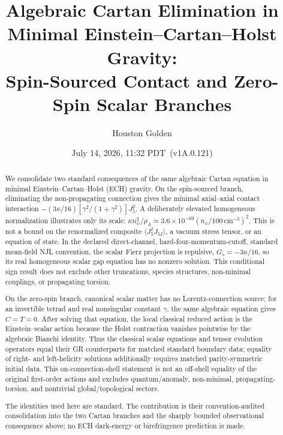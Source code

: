 \documentclass[aps,prd,twocolumn,superscriptaddress,showpacs,preprintnumbers,nofootinbib,longbibliography,floatfix]{revtex4-2}
\newcommand{\paperVersion}{v1A.0.121}
\newcommand{\paperTimestamp}{July 14, 2026, 11:32 PDT}
\begin{document}

\title{Algebraic Cartan Elimination in Minimal Einstein--Cartan--Holst Gravity:\\
Spin-Sourced Contact and Zero-Spin Scalar Branches}

\author{Houston Golden}

\date{\paperTimestamp\ (\paperVersion)}

\begin{abstract}
We consolidate two standard consequences of the same algebraic Cartan
equation in minimal Einstein--Cartan--Holst (ECH) gravity.  On the
spin-sourced branch, eliminating the non-propagating connection gives the
minimal axial--axial contact interaction
$-(3\kappa/16)[\gamma^2/(1+\gamma^2)]J_5^2$.  A deliberately elevated
homogeneous normalization illustrates only its scale:
$\kappa n_\psi^2/\rho_\Lambda\simeq
3.6\times10^{-69}(n_\psi/100\,\mathrm{cm}^{-3})^2$.
This is not a bound on the renormalized composite
$\langle J_5^I J_{5I}\rangle$, a vacuum stress tensor, or an equation of
state.  In the declared direct-channel, hard-four-momentum-cutoff, standard
mean-field NJL convention, the scalar Fierz projection is repulsive,
$G_s=-3\kappa/16$, so its real homogeneous scalar gap equation has no nonzero
solution.  This conditional sign result does not exclude other truncations,
species structures, non-minimal couplings, or propagating torsion.

On the zero-spin branch, canonical scalar matter has no Lorentz-connection
source; for an invertible tetrad and real nonsingular constant $\gamma$, the
same algebraic equation gives $C=T=0$.  After solving that equation, the local
classical reduced action is the Einstein--scalar action because the Holst
contraction vanishes pointwise by the algebraic Bianchi identity.  Thus the
classical scalar equations and tensor evolution operators equal their GR
counterparts for matched standard boundary data; equality of right- and
left-helicity solutions additionally requires matched parity-symmetric
initial data.  This on-connection-shell statement is not an off-shell equality
of the original first-order actions and excludes quantum/anomaly,
non-minimal, propagating-torsion, and nontrivial global/topological sectors.

The identities used here are standard.  The contribution is their
convention-audited consolidation into the two Cartan branches and the sharply
bounded observational consequence above; no ECH dark-energy or
birefringence prediction is made.
\end{abstract}
\end{document}

